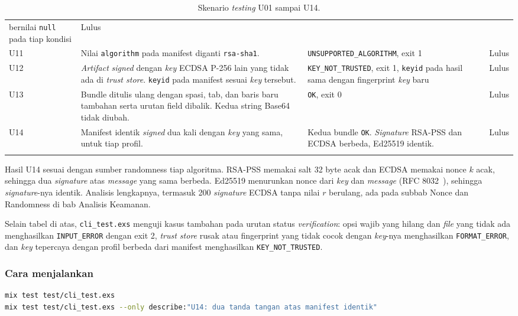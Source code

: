 {\begin{longtable}{@{}p{1cm}p{7.2cm}p{4.3cm}p{1.6cm}@{}}
  bernilai \texttt{null} pada tiap kondisi & Lulus \\
U11 & Nilai \texttt{algorithm} pada manifest diganti \texttt{rsa-sha1}.
  & \texttt{UNSUPPORTED\_ALGORITHM}, exit 1 & Lulus \\
U12 & \textit{Artifact} \textit{signed} dengan \textit{key} ECDSA P-256 lain yang tidak ada di
  \textit{trust store}. \texttt{keyid} pada manifest sesuai \textit{key} tersebut.
  & \texttt{KEY\_NOT\_TRUSTED}, exit 1, \texttt{keyid} pada hasil sama dengan fingerprint
  \textit{key} baru & Lulus \\
U13 & Bundle ditulis ulang dengan spasi, tab, dan baris baru tambahan serta urutan field
  dibalik. Kedua string Base64 tidak diubah. & \texttt{OK}, exit 0 & Lulus \\
U14 & Manifest identik \textit{signed} dua kali dengan \textit{key} yang sama, untuk tiap profil.
  & Kedua bundle \texttt{OK}. \textit{Signature} RSA-PSS dan ECDSA berbeda, Ed25519 identik.
  & Lulus \\
\bottomrule
\caption{Skenario \textit{testing} U01 sampai U14.}
\end{longtable}
}

Hasil U14 sesuai dengan sumber randomness tiap algoritma. RSA-PSS memakai salt 32 byte
acak dan ECDSA memakai nonce $k$ acak, sehingga dua \textit{signature} atas \textit{message} yang sama
berbeda. Ed25519 menurunkan nonce dari \textit{key} dan \textit{message} (RFC 8032~\cite{rfc8032}), sehingga \textit{signature}-nya identik. Analisis lengkapnya, termasuk 200 \textit{signature} ECDSA tanpa nilai $r$
berulang, ada pada subbab Nonce dan Randomness di bab Analisis Keamanan.

Selain tabel di atas, \texttt{cli\_test.exs} menguji kasus tambahan pada urutan status
\textit{verification}: opsi wajib yang hilang dan \textit{file} yang tidak ada menghasilkan
\texttt{INPUT\_ERROR} dengan exit 2, \textit{trust store} rusak atau fingerprint yang tidak
cocok dengan \textit{key}-nya menghasilkan \texttt{FORMAT\_ERROR}, dan \textit{key} tepercaya dengan
profil berbeda dari manifest menghasilkan \texttt{KEY\_NOT\_TRUSTED}.

\subsubsection*{Cara menjalankan}
\begin{lstlisting}[language=bash,numbers=none]
mix test test/cli_test.exs
mix test test/cli_test.exs --only describe:"U14: dua tanda tangan atas manifest identik"
\end{lstlisting}

